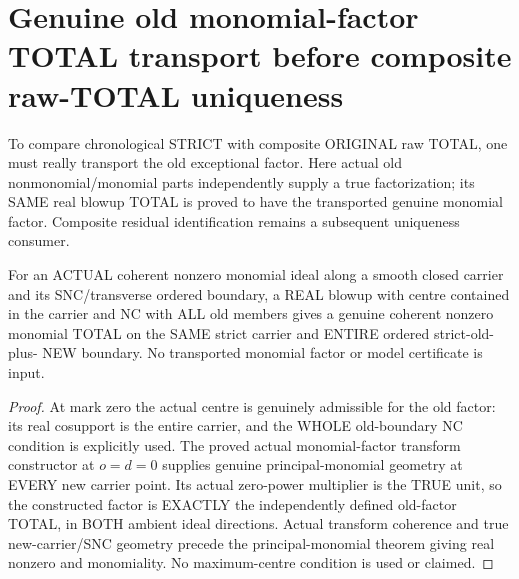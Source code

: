 \section{Genuine old monomial-factor TOTAL transport before composite raw-TOTAL uniqueness}

To compare chronological STRICT with composite ORIGINAL raw TOTAL, one
must really transport the old exceptional factor. Here actual old
nonmonomial/monomial parts independently supply a true factorization;
its SAME real blowup TOTAL is proved to have the transported genuine
monomial factor. Composite residual identification remains a subsequent
uniqueness consumer.

\begin{lemma}
\label{hir:sharp-actual-old-monomial-whole-total-transport}
\leanok
For an ACTUAL coherent nonzero monomial ideal along a smooth closed carrier
and its SNC/transverse ordered boundary, a REAL blowup with centre contained
in the carrier and NC with ALL old members gives a genuine coherent nonzero
monomial TOTAL on the SAME strict carrier and ENTIRE ordered strict-old-plus-
NEW boundary. No transported monomial factor or model certificate is input.
\end{lemma}
\begin{proof}
At mark zero the actual centre is genuinely admissible for the old factor:
its real cosupport is the entire carrier, and the WHOLE old-boundary NC
condition is explicitly used. The proved actual monomial-factor transform
constructor at $o=d=0$ supplies genuine principal-monomial geometry at
EVERY new carrier point. Its actual zero-power multiplier is the TRUE unit,
so the constructed factor is EXACTLY the independently defined old-factor
TOTAL, in BOTH ambient ideal directions. Actual transform coherence and
true new-carrier/SNC geometry precede the principal-monomial theorem giving
real nonzero and monomiality. No maximum-centre condition is used or claimed.
\end{proof}

